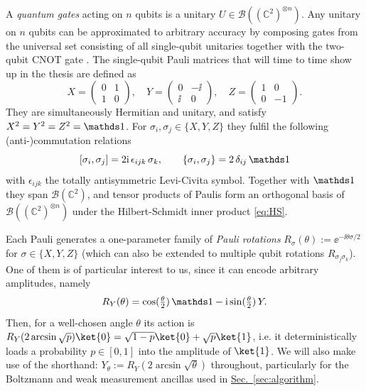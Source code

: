 A \emph{quantum gates} acting on $n$ qubits is a unitary $U \in \mathcal{B}((\mathbb{C}^2)^{\otimes n})$. Any unitary on $n$ qubits can be approximated to arbitrary accuracy by composing gates from the universal set consisting of all single-qubit unitaries together with the two-qubit \textsc{CNOT} gate \cite{bible}. The single-qubit Pauli matrices that will time to time show up in the thesis are defined as
\begin{equation}
    \label{eq:paulis}
    X = \begin{pmatrix} 0 & 1 \\ 1 & 0 \end{pmatrix}, \quad
    Y = \begin{pmatrix} 0 & -\ii \\ \ii & 0 \end{pmatrix}, \quad
    Z = \begin{pmatrix} 1 & 0 \\ 0 & -1 \end{pmatrix}.
\end{equation}
They are simultaneously Hermitian and unitary, and satisfy $X^2 = Y^2 = Z^2 = \idm$. For $\sigma_i, \sigma_j \in \{X, Y, Z\}$ they fulfil the following (anti-)commutation relations
$$
[\sigma_i, \sigma_j] = 2\ii\,\epsilon_{ijk}\,\sigma_k, \qquad \{\sigma_i, \sigma_j\} = 2\,\delta_{ij}\,\idm
$$
with $\epsilon_{ijk}$ the totally antisymmetric Levi-Civita symbol. Together with $\idm$ they span $\mathcal{B}(\mathbb{C}^2)$, and tensor products of Paulis form an orthogonal basis of $\mathcal{B}((\mathbb{C}^2)^{\otimes n})$ under the Hilbert-Schmidt inner product \eqref{eq:HS}. 

Each Pauli generates a one-parameter family of \emph{Pauli rotations} $R_\sigma(\theta) := \ee^{-\ii\theta\sigma/2}$ for $\sigma\in\{X,Y,Z\}$ (which can also be extended to multiple qubit rotations $R_{\sigma_j\sigma_k}$). One of them is of particular interest to us, since it can encode arbitrary amplitudes, namely 
\begin{equation}
    R_Y(\theta) = \cos(\tfrac{\theta}{2})\,\idm - \ii\sin(\tfrac{\theta}{2})\,Y.
\end{equation}
Then, for a well-chosen angle $\theta$ its action is $R_Y(2\arcsin\sqrt{p})\ket{0} = \sqrt{1-p}\ket{0} + \sqrt{p}\ket{1}$, i.e. it deterministically loads a probability $p\in[0, 1]$ into the amplitude of $\ket{1}$. We will also make use of the shorthand: $Y_\theta := R_Y(2\arcsin\sqrt{\theta})$ throughout, particularly for the Boltzmann and weak measurement ancillas used in \hyperref[sec:algorithm]{Sec.~\ref*{sec:algorithm}}. 

